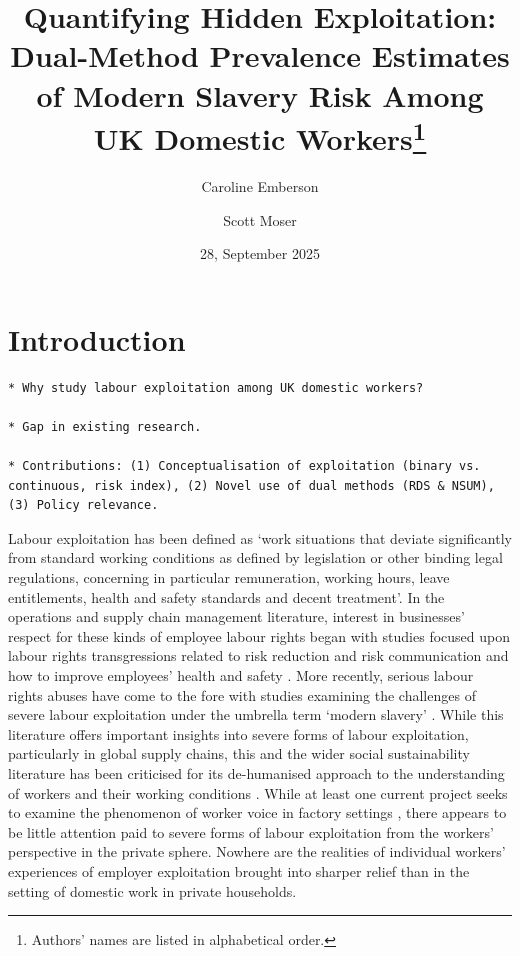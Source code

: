 \documentclass[
  12pt,
  letterpaper,
  DIV=11,
  numbers=noendperiod]{scrartcl}
\title{Quantifying Hidden Exploitation: Dual-Method Prevalence Estimates
of Modern Slavery Risk Among UK Domestic Workers\footnote{Authors' names
  are listed in alphabetical order.}}
\author{Caroline Emberson \and Scott Moser}
\date{28, September 2025}
\theoremstyle{plain}
\theoremstyle{definition}
\renewcommand*\contentsname{Table of contents}
\newcommand\contentsname{Table of contents}
\begin{document}
\maketitle

\renewcommand*\contentsname{Table of contents}
{
\hypersetup{linkcolor=}
\setcounter{tocdepth}{3}
\tableofcontents
}

\newpage

\section{Introduction}\label{introduction}

\begin{verbatim}
* Why study labour exploitation among UK domestic workers?
    
* Gap in existing research.
    
* Contributions: (1) Conceptualisation of exploitation (binary vs. continuous, risk index), (2) Novel use of dual methods (RDS & NSUM), (3) Policy relevance.
\end{verbatim}

Labour exploitation has been defined as `work situations that deviate 
significantly from standard working conditions as defined by legislation
or other binding legal regulations, concerning in particular
remuneration, working hours, leave entitlements, health and safety
standards and decent treatment'\autocite[10]{european_union_for_fundamental_rights_severe_2015}. In the operations and supply chain management literature,
interest in businesses' respect for these kinds of employee labour rights began with
studies focused upon labour rights transgressions related to risk
reduction and risk communication and how to improve
employees' health and safety \autocite{chinander_aligning_2001,wolf_operationalizing_2001}. More recently, 
serious labour rights abuses have come to the fore with studies
examining the challenges of severe labour exploitation under the umbrella term `modern slavery' \autocite{gold_modern_2015,new_modern_2015,benstead_horizontal_2018,stevenson_modern_2018}. While this literature
offers important insights into severe forms of labour exploitation, particularly
in global supply chains, this and the wider social sustainability literature has
been criticised for its de-humanised approach to the understanding
of workers and their working conditions \autocite{soundararajan_humanizing_2021}. While at least one current
project seeks to examine the phenomenon of worker voice in factory
settings  \autocite{leverhulme_trust_research_2022}, there appears to be little attention paid to severe forms of labour exploitation from the workers' perspective in the private sphere. Nowhere are the realities of individual workers' experiences of employer exploitation brought into sharper relief than in the setting of domestic
work in private households.
\end{document}
